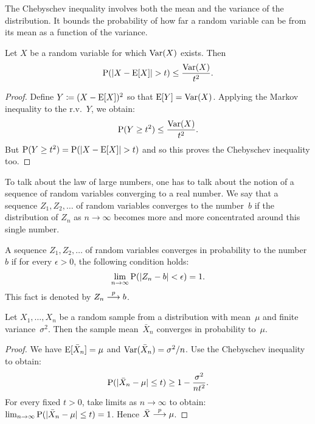 The Chebyschev inequality involves both the mean and the variance of the 
distribution. It bounds the probability of how far a random variable can be 
from its mean as a function of the variance. 
\begin{theorem}
Let $X$ be a random variable for which $\operatorname{Var} (X)$ exists. Then 
\begin{equation} \label{ineq:chebyschev}
    \operatorname{P} (\left | X - \operatorname{E} [X] \right | > t) \leq \frac{\operatorname{Var} (X)}{t^2}.
\end{equation}
\end{theorem} 
\begin{proof}
Define $Y \coloneqq (X - \operatorname{E} [X])^2$ so that $\operatorname{E} [Y] = \operatorname{Var} (X)$. Applying
the Markov inequality to the r.v.~$Y$, we obtain:
\[
    \operatorname{P} (Y \geq t^2) \leq \frac{\operatorname{Var} (X)}{t^2}.
\] 
But $\operatorname{P} (Y \geq t^2) = \operatorname{P} (| X - \operatorname{E} [X] | > t)$ and so this proves the 
Chebyschev inequality too.
\end{proof}

To talk about the law of large numbers, one has to talk about the notion of 
a sequence of random variables converging to a real number. We say that 
a sequence $Z_1, Z_2, \ldots$ of random variables converges to the number~$b$
if the distribution of $Z_n$ as $n \to \infty$ becomes more and more 
concentrated around this single number. 
\begin{definition}
A sequence $Z_1, Z_2, \ldots$ of random variables converges in probability to 
the number~$b$ if for every $\epsilon > 0$, the following condition holds:
\begin{equation}
    \lim_{n \to \infty} \operatorname{P} (|Z_n - b| < \epsilon) = 1.
\end{equation}
This fact is denoted by $Z_n \stackrel{p}{\longrightarrow} b$. 
\end{definition} 

\begin{theorem}\label{thm:lln}
Let $X_1, \ldots, X_n$ be a random sample from a distribution with mean~$\mu$
and finite variance~$\sigma^2$. Then the sample mean~$\bar{X}_n$ converges in 
probability to~$\mu$.
\end{theorem}
\begin{proof}
We have $\operatorname{E} [\bar{X}_n] = \mu$ and $\operatorname{Var} (\bar{X}_n) = \sigma^2 / n$. Use 
the Chebyschev inequality to obtain:
\[
    \operatorname{P} (|\bar{X}_n - \mu| \leq t) \geq 1 - \frac{\sigma^2}{n t^2}.
\]
For every fixed $t > 0$, take limits as $n \to \infty$ to obtain:  
$\lim_{n \to \infty} \operatorname{P} (|\bar{X}_n - \mu| \leq t) = 1$. Hence $\bar{X} \stackrel{p}{\longrightarrow} \mu$.
\end{proof}

